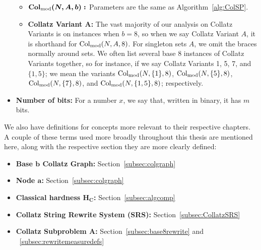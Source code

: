 \begin{itemize}
\begin{itemize}
      \item $\boldsymbol{\mathrm{Col}_{\text{mod}}(N,A,b):}$ Parameters are the same as Algorithm~\ref{alg:ColSP}.
      \item \textbf{Collatz Variant A:} The vast majority of our analysis on Collatz Variants is on instances when $b = 8$, so when we say Collatz Variant $A$, it is shorthand for $\mathrm{Col}_{\text{mod}}(N,A,8)$. For singleton sets $A$, we omit the braces normally around sets. We often list several base 8 instances of Collatz Variants together, so for instance, if we say Collatz Variants 1, 5, 7, and $\{1,5\}$; we mean the variants $\mathrm{Col}_{\text{mod}}(N,\{1\},8)$, $\mathrm{Col}_{\text{mod}}(N,\{5\},8)$, $\mathrm{Col}_{\text{mod}}(N,\{7\},8)$, and $\mathrm{Col}_{\text{mod}}(N,\{1,5\},8)$; respectively.
      \end{itemize}

\item \textbf{Number of bits:} For a number $x$, we say that, written in binary, it has $m$ bits.
\end{itemize}
We also have definitions for concepts more relevant to their respective chapters. A couple of these terms used more broadly throughout this thesis are mentioned here, along with the respective section they are more clearly defined:
\begin{itemize}
\item \textbf{Base $\boldsymbol b$ Collatz Graph:} Section~\ref{subsec:colgraph}
\item \textbf{Node $\boldsymbol a$:} Section~\ref{subsec:colgraph}
\item \textbf{Classical hardness $\boldsymbol {H_C}$:} Section~\ref{subsec:algcomp}
\item \textbf{Collatz String Rewrite System (SRS):} Section~\ref{subsec:CollatzSRS}
\item \textbf{Collatz Subproblem $\boldsymbol A$:} Section~\ref{subsec:base8rewrite} and ~\ref{subsec:rewritemeasuredefs} 
\end{itemize}
%
